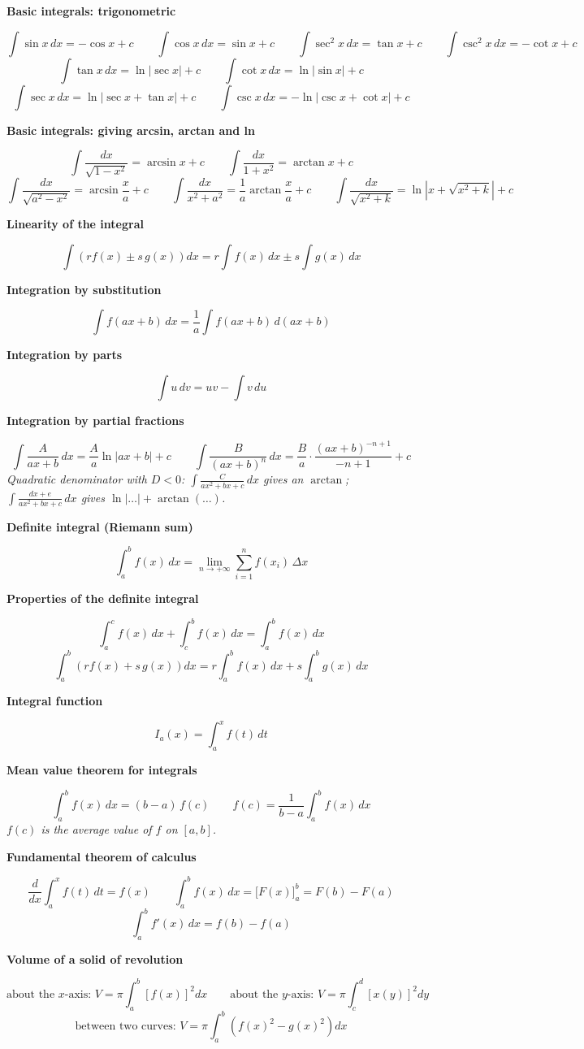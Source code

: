 \documentclass[11pt]{article}
\newcommand{\sub}[1]{\par\medskip\textbf{#1}\par}
\newcommand{\expl}[1]{{\color{gray}\itshape #1}\par}
\begin{document}
\sub{Basic integrals: trigonometric}
\[ \int \sin x\,dx = -\cos x + c \qquad \int \cos x\,dx = \sin x + c \qquad \int \sec^2 x\,dx = \tan x + c \qquad \int \csc^2 x\,dx = -\cot x + c \]
\[ \int \tan x\,dx = \ln|\sec x| + c \qquad \int \cot x\,dx = \ln|\sin x| + c \]
\[ \int \sec x\,dx = \ln|\sec x + \tan x| + c \qquad \int \csc x\,dx = -\ln|\csc x + \cot x| + c \]

\sub{Basic integrals: giving arcsin, arctan and ln}
\[ \int \frac{dx}{\sqrt{1 - x^2}} = \arcsin x + c \qquad \int \frac{dx}{1 + x^2} = \arctan x + c \]
\[ \int \frac{dx}{\sqrt{a^2 - x^2}} = \arcsin\frac{x}{a} + c \qquad \int \frac{dx}{x^2 + a^2} = \frac{1}{a}\arctan\frac{x}{a} + c \qquad \int \frac{dx}{\sqrt{x^2 + k}} = \ln\left|x + \sqrt{x^2 + k}\right| + c \]

\sub{Linearity of the integral}
\[ \int \left(r f(x) \pm s\,g(x)\right)dx = r\int f(x)\,dx \pm s\int g(x)\,dx \]

\sub{Integration by substitution}
\[ \int f(ax + b)\,dx = \frac{1}{a}\int f(ax + b)\,d(ax + b) \]

\sub{Integration by parts}
\[ \int u\,dv = uv - \int v\,du \]

\sub{Integration by partial fractions}
\[ \int \frac{A}{ax + b}\,dx = \frac{A}{a}\ln|ax + b| + c \qquad \int \frac{B}{(ax + b)^n}\,dx = \frac{B}{a}\cdot\frac{(ax + b)^{-n+1}}{-n+1} + c \]
\expl{Quadratic denominator with $D < 0$: $\int \frac{C}{ax^2 + bx + c}\,dx$ gives an $\arctan$; $\int \frac{dx + e}{ax^2 + bx + c}\,dx$ gives $\ln|\dots| + \arctan(\dots)$.}

\sub{Definite integral (Riemann sum)}
\[ \int_a^b f(x)\,dx = \lim_{n\to +\infty} \sum_{i=1}^{n} f(x_i)\,\Delta x \]

\sub{Properties of the definite integral}
\[ \int_a^c f(x)\,dx + \int_c^b f(x)\,dx = \int_a^b f(x)\,dx \]
\[ \int_a^b \left(r f(x) + s\,g(x)\right)dx = r\int_a^b f(x)\,dx + s\int_a^b g(x)\,dx \]

\sub{Integral function}
\[ I_a(x) = \int_a^x f(t)\,dt \]

\sub{Mean value theorem for integrals}
\[ \int_a^b f(x)\,dx = (b - a)\,f(c) \qquad f(c) = \frac{1}{b - a}\int_a^b f(x)\,dx \]
\expl{$f(c)$ is the average value of $f$ on $[a, b]$.}

\sub{Fundamental theorem of calculus}
\[ \frac{d}{dx}\int_a^x f(t)\,dt = f(x) \qquad \int_a^b f(x)\,dx = \Big[F(x)\Big]_a^b = F(b) - F(a) \]
\[ \int_a^b f'(x)\,dx = f(b) - f(a) \]

\sub{Volume of a solid of revolution}
\[ \text{about the } x\text{-axis: } V = \pi\int_a^b \left[f(x)\right]^2 dx \qquad \text{about the } y\text{-axis: } V = \pi\int_c^d \left[x(y)\right]^2 dy \]
\[ \text{between two curves: } V = \pi\int_a^b \left(f(x)^2 - g(x)^2\right)dx \]
\end{document}
